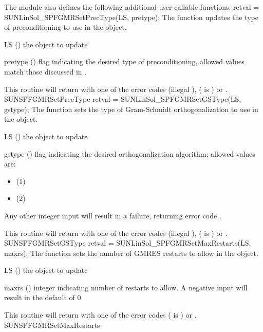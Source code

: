 The {\sunlinsolspfgmr} module also defines the following additional
user-callable functions.
%
%
{
  retval = SUNLinSol\_SPFGMRSetPrecType(LS, pretype);
}
{
  The function  updates the type of
  preconditioning to use in the {\sunlinsolspfgmr} object.
}
{
  \begin{args}[pretype]
  \item[LS] ()
    the {\sunlinsolspfgmr} object to update
  \item[pretype] ()
    flag indicating the desired type of preconditioning, allowed
    values match those discussed in .
  \end{args}
}
{
  This routine will return with one of the error codes
   (illegal ), 
  ( is ) or .
}
{}
{SUNSPFGMRSetPrecType}
%
%
{
  retval = SUNLinSol\_SPFGMRSetGSType(LS, gstype);
}
{
  The function  sets the type of
  Gram-Schmidt orthogonalization to use in the {\sunlinsolspfgmr}
  object.
}
{
  \begin{args}[gstype]
  \item[LS] ()
    the {\sunlinsolspfgmr} object to update
  \item[gstype] ()
    flag indicating the desired orthogonalization algorithm; allowed
    values are:
    \begin{itemize}
    \item {} (1)
    \item {} (2)
    \end{itemize}
    Any other integer input will result in a
    failure, returning error code \newline {}.
  \end{args}
}
{
  This routine will return with one of the error codes
   (illegal ), 
  ( is ) or .
}
{}
{SUNSPFGMRSetGSType}
%
%
{
  retval = SUNLinSol\_SPFGMRSetMaxRestarts(LS, maxrs);
}
{
  The function  sets the number of
  GMRES \newline restarts to allow in the {\sunlinsolspfgmr} object.
}
{
  \begin{args}[maxrs]
  \item[LS] ()
    the {\sunlinsolspfgmr} object to update
  \item[maxrs] ()
    integer indicating number of restarts to allow.  A negative input
    will result in the default of 0.
  \end{args}
}
{
  This routine will return with one of the error codes
   ( is ) or .
}
{}
{SUNSPFGMRSetMaxRestarts}


